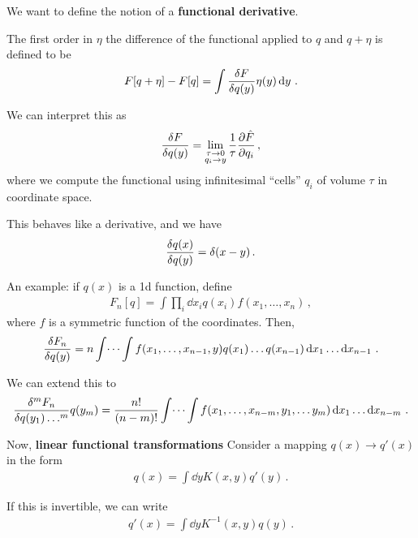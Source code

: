 \documentclass[main.tex]{subfiles}
\begin{document}

We want to define the notion of a \textbf{functional derivative}. 

The first order in \(\eta \) the difference of the functional applied to \(q\) and \(q + \eta \) is defined to be 
%
\begin{align}
F[q + \eta ] - F[q ] = \int  \fdv{F}{q(y)} \eta (y) \dd{y}
\,.
\end{align}

We can interpret this as 
%
\begin{align}
\fdv{F}{q (y)} = \lim_{\substack{\tau \to 0 \\ q_{i} \to y} } \frac{1}{\tau } \pdv{\hat{F}}{q_{i}}
\,,
\end{align}
%
where we compute the functional using infinitesimal ``cells'' \(q_i\)  of volume \(\tau \) in coordinate space.

This behaves like a derivative, and we have 
%
\begin{align}
\fdv{q(x)}{q(y)} = \delta (x- y)
\,.
\end{align}

An example: if \(q(x)\) is a 1d function, define 
%
\begin{align}
F_{n}[q] = \int \prod_i \dd{x_{i}} q(x_{i}) f(x_1, \dots, x_{n})  
\,,
\end{align}
%
where \(f\) is a symmetric function of the coordinates. Then, 
%
\begin{align}
\fdv{F_{n}}{q(y)} = n \int \dots \int f(x_1 , \dots, x_{n-1}, y) q(x_1 ) \dots q(x_{n-1}) \dd{x_{1}} \dots \dd{x_{n-1}}
\,.
\end{align}

We can extend this to 
%
\begin{align}
\fdv[m]{F_{n}}{q(y_1 )\dots}{ q(y_m)}
= \frac{n!}{(n-m)!} \int  \dots \int f(x_1, \dots, x_{n-m}, y_1, \dots y_{m}) \dd{x_1 } \dots \dd{x_{n-m}}
\,.
\end{align}

Now, \textbf{linear functional transformations}
Consider a mapping \(q (x) \to q' (x)\) in the form 
%
\begin{align}
q(x) = \int \dd{y} K(x, y) q' (y)
\,.
\end{align}

If this is invertible, we can write 
%
\begin{align}
q' (x) = \int \dd{y} K^{-1}(x, y) q(y)
\,.
\end{align}
\end{document}
